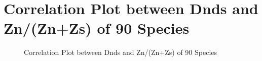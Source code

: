 \newpage
\section*{\normalfont Correlation Plot between Dnds and Zn/(Zn+Zs) of 90 Species}

\begin{figure}[H]
     \centering
     \caption{Correlation Plot between Dnds and Zn/(Zn+Zs) of 90 Species}
\end{figure}
\label{fig:dnds_ZnZs_corr}












